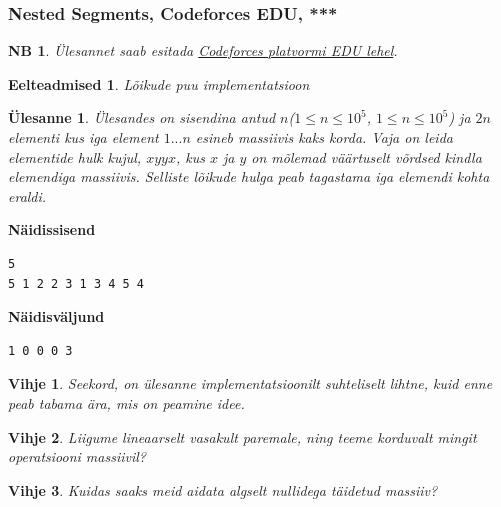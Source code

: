 \documentclass{trkut}
\newtheorem*{prereq}{Eelteadmised}
\newtheorem*{extra}{NB}
\newtheorem*{vihje}{Vihje}
\newtheorem*{Text}{Ülesanne}
\begin{document}
\subsubsection{Nested Segments, Codeforces EDU, ***}
\begin{extra}
Ülesannet saab esitada \href{https://codeforces.com/edu/course/2/lesson/4/3/practice/contest/274545/problem/C}{Codeforces platvormi EDU lehel}.
\end{extra}
\begin{prereq}
Lõikude puu implementatsioon
\end{prereq}
\begin{Text}
Ülesandes on sisendina antud $n$($1\le n\le 10^5$, $1\le n\le 10^5$) ja $2n$ elementi kus iga element $1...n$ esineb massiivis kaks korda. 
Vaja on leida elementide hulk kujul, $xyyx$, kus $x$ ja $y$ on mõlemad väärtuselt võrdsed kindla elemendiga massiivis.
Selliste lõikude hulga peab tagastama iga elemendi kohta eraldi. 

\parencite{neseg}
\end{Text}



\textbf{Näidissisend}

\begin{verbatim}
5
5 1 2 2 3 1 3 4 5 4
\end{verbatim}

\textbf{Näidisväljund}

\begin{verbatim}
1 0 0 0 3 
\end{verbatim}


\begin{vihje}
Seekord, on ülesanne implementatsioonilt suhteliselt lihtne, kuid enne peab tabama ära, mis on peamine idee.
\end{vihje}

\begin{vihje}
Liigume lineaarselt vasakult paremale, ning teeme korduvalt mingit operatsiooni massiivil?
\end{vihje}

\begin{vihje}
Kuidas saaks meid aidata algselt nullidega täidetud massiiv?
\end{vihje}
\end{document}
